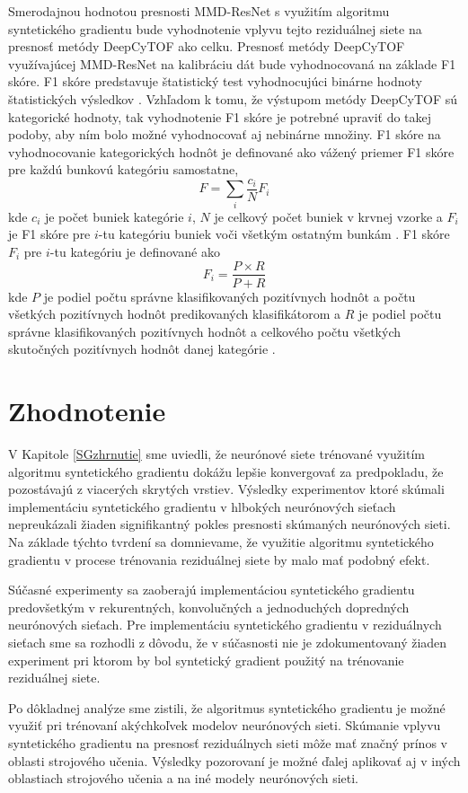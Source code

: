 Smerodajnou hodnotou presnosti MMD-ResNet s využitím algoritmu syntetického gradientu bude vyhodnotenie vplyvu tejto reziduálnej siete na presnosť metódy DeepCyTOF ako celku. Presnosť metódy DeepCyTOF využívajúcej MMD-ResNet na kalibráciu dát bude vyhodnocovaná na základe F1 skóre. F1 skóre predstavuje štatistický test vyhodnocujúci binárne hodnoty štatistických výsledkov \cite{sasaki2007truth}. Vzhľadom k tomu, že výstupom metódy DeepCyTOF sú kategorické hodnoty, tak vyhodnotenie F1 skóre je potrebné upraviť do takej podoby, aby ním bolo možné vyhodnocovať aj nebinárne množiny. F1 skóre na vyhodnocovanie kategorických hodnôt je definované ako vážený priemer F1 skóre pre každú bunkovú kategóriu samostatne, 
\begin{equation}
    F=\sum_i \frac{c_i}{N}F_i
\end{equation}
kde $c_i$ je počet buniek kategórie $i$, $N$ je celkový počet buniek v krvnej vzorke a $F_i$ je F1 skóre pre $i$-tu kategóriu buniek voči všetkým ostatným bunkám \cite{Li2017}. F1 skóre $F_i$ pre $i$-tu kategóriu je definované ako 
\begin{equation}
F_i=\frac{P \times R}{P + R}
\end{equation}
kde $P$ je podiel počtu správne klasifikovaných pozitívnych hodnôt a počtu všetkých pozitívnych hodnôt predikovaných klasifikátorom a $R$ je podiel počtu správne klasifikovaných pozitívnych hodnôt a celkového počtu všetkých skutočných pozitívnych hodnôt danej kategórie \cite{sasaki2007truth}.

\chapter{Zhodnotenie}

V Kapitole \ref{SGzhrnutie} sme uviedli, že neurónové siete trénované využitím algoritmu syntetického gradientu dokážu lepšie konvergovať za predpokladu, že pozostávajú z viacerých skrytých vrstiev. Výsledky experimentov ktoré skúmali implementáciu syntetického gradientu v hlbokých neurónových sieťach nepreukázali žiaden signifikantný pokles presnosti skúmaných neurónových sieti. Na základe týchto tvrdení sa domnievame, že využitie algoritmu syntetického gradientu v procese trénovania reziduálnej siete by malo mať podobný efekt. 

Súčasné experimenty sa zaoberajú implementáciou syntetického gradientu predovšetkým v rekurentných, konvolučných a jednoduchých dopredných neurónových sieťach. Pre implementáciu syntetického gradientu v reziduálnych sieťach sme sa rozhodli z dôvodu, že v súčasnosti nie je zdokumentovaný žiaden experiment pri ktorom by bol syntetický gradient použitý na trénovanie reziduálnej siete. 

Po dôkladnej analýze sme zistili, že algoritmus syntetického gradientu je možné využiť pri trénovaní akýchkoľvek modelov neurónových sieti. Skúmanie vplyvu syntetického gradientu na presnosť reziduálnych sieti môže mať značný prínos v oblasti strojového učenia. Výsledky pozorovaní je možné ďalej aplikovať aj v iných oblastiach strojového učenia a na iné modely neurónových sieti.

